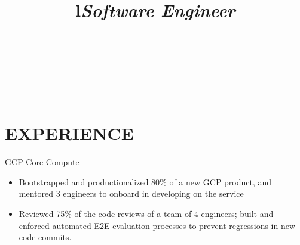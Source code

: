 \documentclass[margin,11pt]{res}
\begin{document}

\address{mark.x.qi@gmail.com $\bullet$ 404-952-0273 $\bullet$ 901 NW 61$^{st}$ Street, Seattle, WA 98107}


\begin{resume}

\begin{format}
\\
\title{l}\\
\body\\
\end{format}

\section{EXPERIENCE}
\title{\sl{Software Engineer}}
\begin{position}
GCP Core Compute\\
\begin{itemize}
\item Bootstrapped and productionalized 80\% of a new GCP product, and mentored 3 engineers to onboard in developing on the service
\item Reviewed 75\% of the code reviews of a team of 4 engineers; built and enforced automated E2E evaluation processes to prevent regressions in new code commits.
\end{itemize}
\end{position}


\end{resume}
\end{document}
